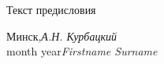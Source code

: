 %
%

\preface
{}
Текст предисловия
 

\vspace{\baselineskip}
\begin{flushright}\noindent
Минск,\hfill {\it А.Н. Курбацкий}\\
month year\hfill {\it Firstname  Surname}\\
\end{flushright}


